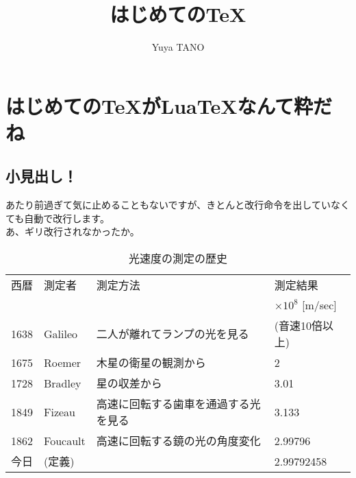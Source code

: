 \documentclass{ltjsarticle}
\begin{document}
\title{はじめての\TeX }
\author{Yuya TANO}
\maketitle
\section{はじめての\TeX がLua\TeX なんて粋だね}

\subsection{小見出し！}
あたり前過ぎて気に止めることもないですが、きとんと改行命令を出していなくても自動で改行します。
\\あ、ギリ改行されなかったか。

\begin{table}[h]
	\caption{光速度の測定の歴史}
	\label{table:SpeedOfLight}
	\centering
	 \begin{tabular}{clll}
	  \hline
	  西暦 & 測定者 & 測定方法 & 測定結果 \\
	   & & & $\times 10^8$ [m/sec] \\
	  \hline \hline
	  1638 & Galileo & 二人が離れてランプの光を見る & (音速10倍以上) \\
	  1675 & Roemer & 木星の衛星の観測から & 2 \\
	  1728 & Bradley & 星の収差から & 3.01 \\
	  1849 & Fizeau & 高速に回転する歯車を通過する光を見る & 3.133 \\
	  1862 & Foucault & 高速に回転する鏡の光の角度変化 & 2.99796 \\
	  今日 & (定義) & & 2.99792458 \\
	  \hline
	 \end{tabular}
\end{table}
\end{document}
